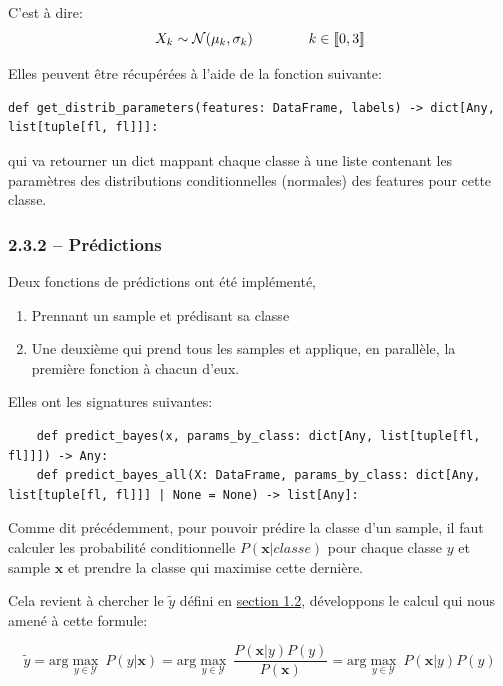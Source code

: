 \documentclass[
]{article}
\providecommand{\tightlist}{%
  \setlength{\itemsep}{0pt}\setlength{\parskip}{0pt}}
\begin{document}
C'est à dire: \[
X_k \sim \mathcal{N}( \mu_k, \sigma_k) \qquad \qquad k \in \llbracket{0, 3}\rrbracket
\]

Elles peuvent être récupérées à l'aide de la fonction suivante:

\begin{lstlisting}
def get_distrib_parameters(features: DataFrame, labels) -> dict[Any, list[tuple[fl, fl]]]:
\end{lstlisting}

qui va retourner un dict mappant chaque classe à une liste contenant les
paramètres des distributions conditionnelles (normales) des features
pour cette classe.

\subsubsection{2.3.2 -- Prédictions}\label{pruxe9dictions-1}

Deux fonctions de prédictions ont été implémenté,

\begin{enumerate}
\def\labelenumi{\arabic{enumi}.}
\tightlist
\item
  Prennant un sample et prédisant sa classe
\item
  Une deuxième qui prend tous les samples et applique, en parallèle, la
  première fonction à chacun d'eux.
\end{enumerate}

Elles ont les signatures suivantes:

\begin{lstlisting}
    def predict_bayes(x, params_by_class: dict[Any, list[tuple[fl, fl]]]) -> Any:
    def predict_bayes_all(X: DataFrame, params_by_class: dict[Any, list[tuple[fl, fl]]] | None = None) -> list[Any]:
\end{lstlisting}

Comme dit précédemment, pour pouvoir prédire la classe d'un sample, il
faut calculer les probabilité conditionnelle \(P(\mathbf{x}| classe)\)
pour chaque classe \(y\) et sample \(\mathbf{x}\) et prendre la classe
qui maximise cette dernière.

Cela revient à chercher le \(\tilde{y}\) défini en
\href{#naive-bayes}{section 1.2}, développons le calcul qui nous amené à
cette formule:

\[
\tilde{y}  = \text{arg}\max_{y \in \mathcal{Y}}\ P(y|\mathbf{x}) = \text{arg}\max_{y \in \mathcal{Y}}\ \frac{P(\mathbf{x}|y)  P(y)}{P(\mathbf{x})} =  \text{arg}\max_{y \in \mathcal{Y}}\ P(\mathbf{x}| y)P(y)
\]
\end{document}

